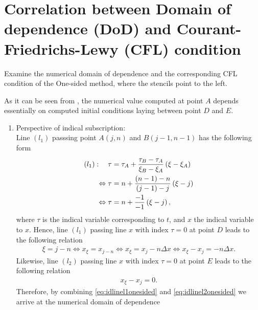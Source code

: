 \documentclass[12pt]{article}
\begin{document}
\pagebreak
\section{Correlation between Domain of dependence (DoD) and Courant-Friedrichs-Lewy (CFL) condition}
\begin{example}\label{eq:example1}
	Examine the numerical domain of dependence 
	and the corresponding CFL condition of the One-sided method,
	where the stencils point to the left.
\end{example}
As it can be seen from , 
the numerical value computed at point $A$ depends essentially on 
computed initial conditions laying between point $D$ and $E$.
\begin{enumerate}
	\item Perspective of indical subscription:\\
	      Line $(l_1)$ passsing point $A(j,n)$ and $B(j-1,n-1)$
	      has the following form
	      \begin{align}
		      (l_1):\quad 
		      \tau & = \tau_A + \frac{\tau_B-\tau_A}{\xi_B-\xi_A}\left(\xi-\xi_A\right) \notag \\
		      \Leftrightarrow
		      \tau & = n + \frac{(n-1)-n}{(j-1)-j} \left(\xi-j\right) \notag                   \\
		      \Leftrightarrow
		      \tau & = n + \frac{-1}{-1} \left(\xi-j\right),
	      \end{align}
	      where $\tau$ is the indical variable corresponding to $t$,
	      and $x$ the indical variable to $x$.
	      Hence, line $(l_1)$ passing line $x$ with index $\tau=0$ at point $D$ leads 
	      to the following relation
	      \begin{align}\label{eq:idlinel1onesided}
		      \xi = j - n
		      \Leftrightarrow 
		      x_{\xi} = x_{j-n}
		      \Leftrightarrow 
		      x_{\xi} = x_{j}-n\Delta x
		      \Leftrightarrow 
		      x_{\xi} - x_j =-n\Delta x.
	      \end{align}
	      Likewise, line $(l_2)$ passing line $x$ with index $\tau=0$ at point $E$
	      leads to the following relation
	      \begin{align}\label{eq:idlinel2onesided}
		      x_{\xi} - x_{j} = 0.
	      \end{align}
	      Therefore, by combining \eqref{eq:idlinel1onesided}
	      and \eqref{eq:idlinel2onesided} we arrive at the numerical domain of dependence

\end{enumerate}
\end{document}
